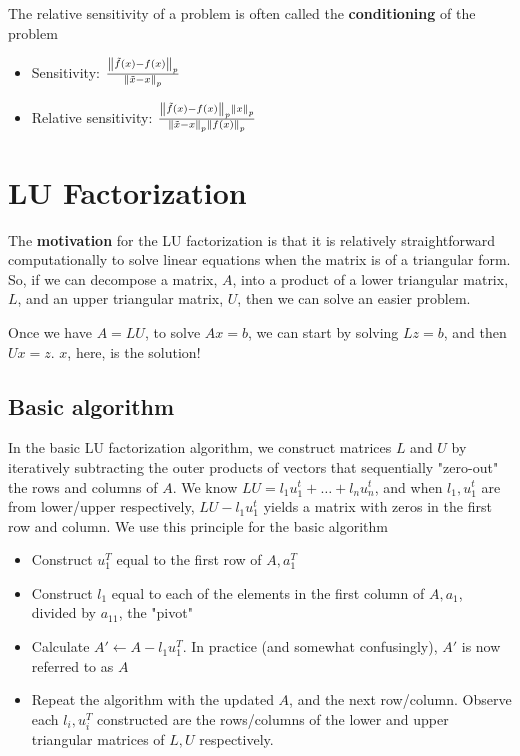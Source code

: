 \documentclass{article}
\newcommand{\norm}[2]{\left\lVert#1\right\rVert_#2}
\begin{document}
The relative sensitivity of a problem is often called the \textbf{conditioning} of the problem
\begin{itemize}
    \item Sensitivity: $\frac{\norm{\Tilde{f}(x) - f(x)}{p}}{\norm{\Tilde{x} - x}{p}}$
    \item Relative sensitivity: $\frac{\norm{\Tilde{f}(x) - f(x)}{p}\norm{x}{p}}{\norm{\Tilde{x} - x}{p}\norm{f(x)}{p}}$
\end{itemize}


\section{LU Factorization}
The \textbf{motivation} for the LU factorization is that it is relatively straightforward computationally to solve linear equations when the matrix is of a triangular form. So, if we can decompose a matrix, $A$, into a product of a lower triangular matrix, $L$, and an upper triangular matrix, $U$, then we can solve an easier problem. 

Once we have $A=LU$, to solve $Ax=b$, we can start by solving $Lz=b$, and then $Ux=z$. $x$, here, is the solution!

\subsection{Basic algorithm}
In the basic LU factorization algorithm, we construct matrices $L$ and $U$ by iteratively subtracting the outer products of vectors that sequentially "zero-out" the rows and columns of $A$. We know $LU = l_1u_1^t + \dots + l_nu_n^t$, and when $l_1, u_1^t$ are from lower/upper respectively, $LU - l_1u_1^t$ yields a matrix with zeros in the first row and column. We use this principle for the basic algorithm 
\begin{itemize}
    \item Construct $u_1^T$ equal to the first row of $A, a_1^T$
    \item Construct $l_1$ equal to each of the elements in the first column of $A, a_1$, divided by $a_{11}$, the "pivot"
    \item Calculate $A' \leftarrow A - l_1u_1^T$. In practice (and somewhat confusingly), $A'$ is now referred to as $A$
    \item Repeat the algorithm with the updated $A$, and the next row/column. Observe each $l_i, u_i^T$ constructed are the rows/columns of the lower and upper triangular matrices of $L, U$ respectively.
\end{itemize}
\end{document}
